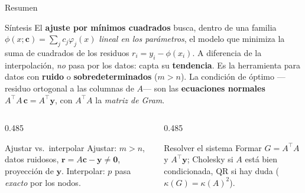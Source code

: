 \documentclass[aspectratio=169,10pt]{beamer}
\begin{document}
\begin{frame}{Resumen}
\begin{cardidea}{Síntesis}{\faLightbulb}
El \textbf{ajuste por mínimos cuadrados} busca, dentro de una familia $\phi(x;\mathbf c)=\sum_j c_j\varphi_j(x)$ \emph{lineal en los parámetros}, el modelo que minimiza la suma de cuadrados de los residuos $r_i=y_i-\phi(x_i)$. A diferencia de la interpolación, \emph{no} pasa por los datos: capta su \textbf{tendencia}. Es la herramienta para datos con \textbf{ruido} o \textbf{sobredeterminados} ($m>n$). La condición de óptimo —residuo ortogonal a las columnas de $A$— son las \textbf{ecuaciones normales} $A^{\!\top}\!A\,\mathbf c=A^{\!\top}\mathbf y$, con $A^{\!\top}\!A$ la \emph{matriz de Gram}.
\end{cardidea}
\vspace{2mm}
\begin{columns}[T]
\begin{column}{0.485\textwidth}
\begin{cardgear}{Ajustar vs.\ interpolar}{\faCogs}
Ajustar: $m>n$, datos ruidosos, $\mathbf r=A\mathbf c-\mathbf y\neq\mathbf 0$, proyección de $\mathbf y$. Interpolar: $p$ pasa \emph{exacto} por los nodos.
\end{cardgear}
\end{column}
\begin{column}{0.485\textwidth}
\begin{cardgear}{Resolver el sistema}{\faCogs}
Formar $G=A^{\!\top}\!A$ y $A^{\!\top}\mathbf y$; Cholesky si $A$ está bien condicionada, QR si hay duda ($\kappa(G)=\kappa(A)^2$).
\end{cardgear}
\end{column}
\end{columns}
\end{frame}
\end{document}
